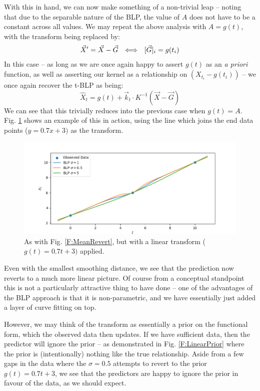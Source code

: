 \documentclass{article}
\newcounter{version}
\begin{document}
			With this in hand, we can now make something of a non-trivial leap -- noting that due to the separable nature of the BLP, the value of $A$ does not have to be a constant across all values. We may repeat the above analysis with $A = g(t)$, with the transform being replaced by:
			\begin{align}
				\vec{X}^\prime = \vec{X} - \vec{G} ~~\Longleftrightarrow~~ [\vec{G}]_i = g(t_i)
			\end{align}
			In this case -- as long as we are once again happy to assert $g(t)$ as an \textit{a priori} function, as well as asserting our kernel as a relationship on $(X_{t_i} - g(t_i))$ -- we once again recover the t-BLP as being:
			\begin{equation}
				\hat{X}_t = g(t) + \vec{k}_t \cdot K^{-1} \left(\vec{X} - \vec{G}\right)
			\end{equation}
			We can see that this trivially reduces into the previous case when $g(t) = A$. Fig. \ref{F:LinearRevert} shows an example of this in action, using the line which joins the end data points ($y = 0.7x+3)$ as the transform. 

			\begin{figure}
				\includegraphics[width=\linewidth,keepaspectratio=true]{Figs/linearReversion.png}
				\caption{As with Fig. \ref{F:MeanRevert}, but with a linear transform ($g(t) = 0.7t + 3)$ applied.}\label{F:LinearRevert}
			\end{figure}

			Even with the smallest smoothing distance, we see that the prediction now reverts to a much more linear picture. Of course from a conceptual standpoint this is not a particularly attractive thing to have done -- one of the advantages of the BLP approach is that it is non-parametric, and we have essentially just added a layer of curve fitting on top. 

			However, we may think of the transform as essentially a prior on the functional form, which the observed data then updates. If we have sufficient data, then the predictor will ignore the prior -- as demonstrated in Fig. \ref{F:LinearPrior} where the prior is (intentionally) nothing like the true relationship. Aside from a few gaps in the data where the $\sigma = 0.5$ attempts to revert to the prior $g(t) = 0.7t + 3$, we see that the predictors are happy to ignore the prior in favour of the data, as we should expect.
\end{document}

